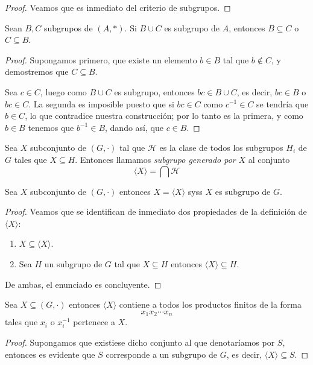 \documentclass[11pt,oneside]{book}
\begin{document}
\begin{proof}
Veamos que es inmediato del criterio de subgrupos.
\end{proof}
\begin{thm}
Sean $B,C$ subgrupos de $(A,*)$. Si $B\cup C$ es subgrupo de $A$, entonces $B\subseteq C$ o $C\subseteq B$.
\end{thm}
\begin{proof}
Supongamos primero, que existe un elemento $b\in B$ tal que $b\notin C$, y demostremos que $C\subseteq B$.

Sea $c\in C$, luego como $B\cup C$ es subgrupo, entonces $bc\in B\cup C$, es decir, $bc\in B$ o $bc\in C$. La segunda es imposible puesto que si $bc\in C$ como $c^{-1}\in C$ se tendría que $b\in C$, lo que contradice nuestra construcción; por lo tanto es la primera, y como $b\in B$ tenemos que $b^{-1}\in B$, dando así, que $c\in B$.
\end{proof}
\begin{mydef}
Sea $X$ subconjunto de $(G,\cdot)$ tal que $\mathcal{H}$ es la clase de todos los subgrupos $H_i$ de $G$ tales que $X\subseteq H$. Entonces llamamos \textit{subgrupo generado por} $X$ al conjunto
$$\langle X\rangle=\bigcap\mathcal{H}$$
\end{mydef}
\begin{cor}
Sea $X$ subconjunto de $(G,\cdot)$ entonces $X=\langle X\rangle$ syss $X$ es subgrupo de $G$.
\end{cor}
\begin{proof}
Veamos que se identifican de inmediato dos propiedades de la definición de $\langle X\rangle$:
\begin{enumerate}[1)]
\item $X\subseteq\langle X\rangle$.
\item Sea $H$ un subgrupo de $G$ tal que $X\subseteq H$ entonces $\langle X\rangle\subseteq H$.
\end{enumerate}
De ambas, el enunciado es concluyente.
\end{proof}
\begin{lem}
Sea $X\subseteq(G,\cdot)$ entonces $\langle X\rangle$ contiene a todos los productos finitos de la forma
$$x_1x_2\cdots x_n$$
tales que $x_i$ o $x_i^{-1}$ pertenece a $X$.
\end{lem}
\begin{proof}
Supongamos que existiese dicho conjunto al que denotaríamos por $S$, entonces es evidente que $S$ corresponde a un subgrupo de $G$, es decir, $\langle X\rangle\subseteq S$.
\end{proof}
\end{document}
